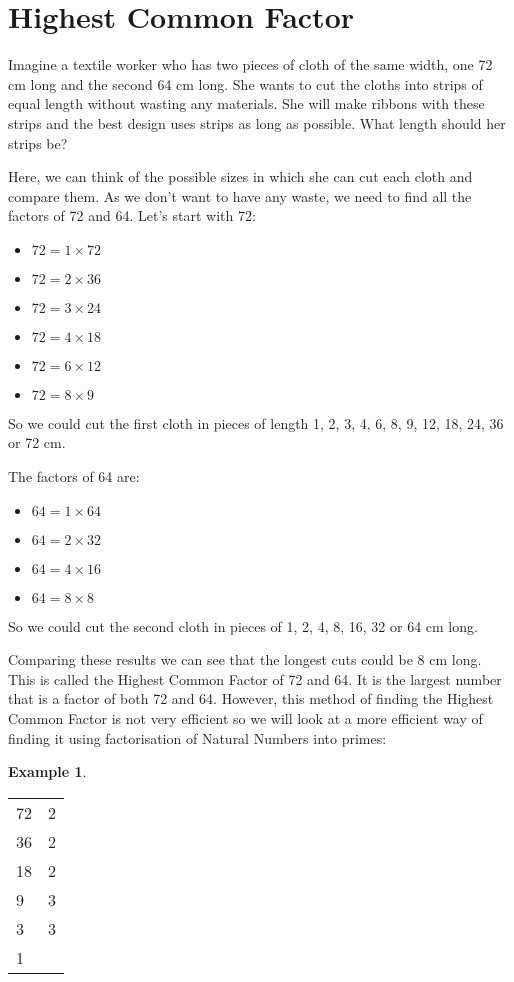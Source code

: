 \documentclass[11pt, oneside]{article}
\theoremstyle{definition}
\newtheorem{exmp}{Example}[section]
\begin{document}
\section{Highest Common Factor}

Imagine a textile worker who has two pieces of cloth of the same width, one 72 cm long and the second 64 cm long. She wants to cut the cloths into strips of equal length without wasting any materials. She will make ribbons with these strips and the best design uses strips as long as possible. What length should her strips be? 

Here, we can think of the possible sizes in which she can cut each cloth and compare them. As we don't want to have any waste, we need to find all the factors of 72 and 64. Let's start with 72:

\begin{itemize}
\item $72 = 1\times 72$
\item $72 = 2 \times 36$
\item $72 = 3 \times 24$
\item $72 = 4 \times 18$
\item $72 = 6\times 12$
\item $72 = 8\times 9$
\end{itemize} 
So we could cut the first cloth in pieces of length 1, 2, 3, 4, 6, 8, 9, 12, 18, 24, 36 or 72 cm.

The factors of 64 are:
\begin{itemize}
\item $64 = 1\times 64$
\item $64 = 2 \times 32$
\item $64 = 4 \times 16$
\item $64 = 8\times 8$
\end{itemize} 
So we could cut the second cloth in pieces of 1, 2, 4, 8, 16, 32 or 64 cm long.

Comparing these results we can see that the longest cuts could be 8 cm long. This is called the Highest Common Factor of 72 and 64. It is the largest number that is a factor of both 72 and 64. However, this method of finding the Highest Common Factor is not very efficient so we will look at a more efficient way of finding it using factorisation of Natural Numbers into primes:

\begin{exmp} \end{exmp}
\begin{tabular}{ p{0.5cm} | p{1.5cm}}
72 & 2  \\
36 & 2  \\
18 & 2  \\
9 & 3  \\
3 & 3 \\
1 &  
\end{tabular}
\end{document}
